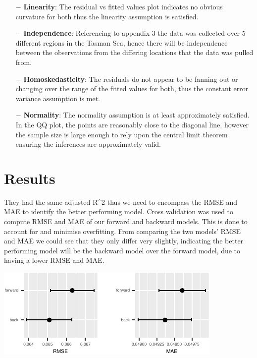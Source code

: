 \documentclass[letterpaper,9pt,twocolumn,twoside,]{pinp}
\begin{document}
\begin{itemize}
     \item[$-$] \textbf{Linearity}: The residual vs fitted values plot indicates no obvious curvature for both thus the linearity assumption is satisfied.
     \item[$-$] \textbf{Independence}: Referencing to appendix 3 the data was collected over 5 different regions in the Tasman Sea, hence there will be independence between the observations from the differing locations that the data was pulled from.
     \item[$-$] \textbf{Homoskedasticity}: The residuals do not appear to be fanning out or changing over the range of the fitted values for both, thus the constant error variance assumption is met.
     \item[$-$] \textbf{Normality}: The normality assumption is at least approximately satisfied. In the QQ plot, the points are reasonably close to the diagonal line, however the sample size is large enough to rely upon the central limit theorem ensuring the inferences are approximately valid.
\end{itemize}

\section{Results}\label{results}

They had the same adjusted R\^{}2 thus we need to encompass the RMSE and
MAE to identify the better performing model. Cross validation was used
to compute RMSE and MAE of our forward and backward models. This is done
to account for and minimise overfitting. From comparing the two models'
RMSE and MAE we could see that they only differ very slightly,
indicating the better performing model will be the backward model over
the forward model, due to having a lower RMSE and MAE.

\begin{center}\includegraphics{ExecSum_files/figure-latex/unnamed-chunk-8-1} \end{center}
\end{document}
